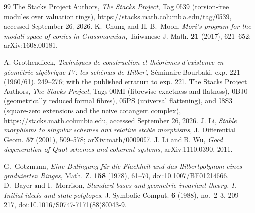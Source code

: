 \documentclass[11pt,reqno]{amsart}
\numberwithin{equation}{section}
\theoremstyle{definition}\newtheorem{definition}[theorem]{Definition}
\theoremstyle{remark}\newtheorem{remark}[theorem]{Remark}
\begin{document}
\begin{thebibliography}{99}
The Stacks Project Authors, \emph{The Stacks Project},
Tag 0539 (torsion-free modules over valuation rings),
\url{https://stacks.math.columbia.edu/tag/0539}, accessed September 26, 2026.
K.~Chung and H.-B.~Moon, \emph{Mori's program for the moduli space
of conics in Grassmannian}, Taiwanese J. Math. \textbf{21} (2017),
621--652; arXiv:1608.00181.

A. Grothendieck, \emph{Techniques de construction et th\'eor\`emes
d'existence en g\'eom\'etrie alg\'ebrique IV: les sch\'emas de Hilbert},
S\'eminaire Bourbaki, exp. 221 (1960/61), 249--276; with the published
erratum to exp. 221.
The Stacks Project Authors, \emph{The Stacks Project},
Tags 00MI (fibrewise exactness and flatness), 0BJ0 (geometrically
reduced formal fibres), 05PS (universal flattening), and 08S3
(square-zero extensions and the naive cotangent complex),
\url{https://stacks.math.columbia.edu}, accessed September 26, 2026.
J. Li, \emph{Stable morphisms to singular schemes and relative
stable morphisms}, J. Differential Geom. \textbf{57} (2001),
509--578; arXiv:math/0009097.
J. Li and B. Wu, \emph{Good degeneration of Quot-schemes and
coherent systems}, arXiv:1110.0390, 2011.


G.~Gotzmann, \emph{Eine Bedingung f\"ur die Flachheit und das
Hilbertpolynom eines graduierten Ringes}, Math. Z. \textbf{158}
(1978), 61--70, doi:10.1007/BF01214566.
D.~Bayer and I.~Morrison, \emph{Standard bases and geometric invariant
theory. I. Initial ideals and state polytopes}, J. Symbolic Comput.
\textbf{6} (1988), no.~2--3, 209--217,
doi:10.1016/S0747-7171(88)80043-9.

\end{thebibliography}
\end{document}
